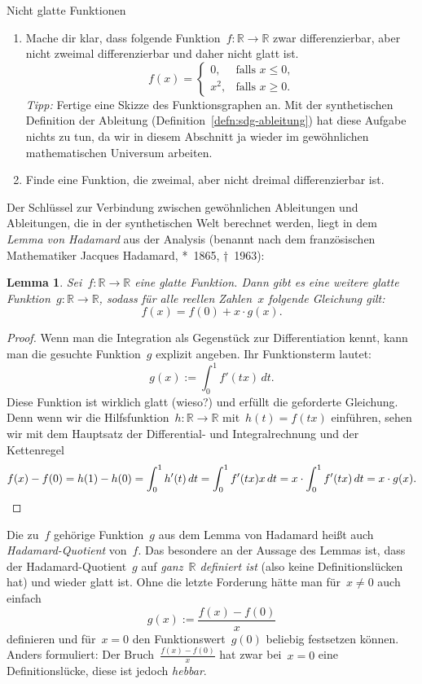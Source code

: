 \documentclass[twoside]{../zirkelblatt}
\newcommand{\RR}{\mathbb{R}}
\theoremstyle{definition}
\theoremstyle{plain}
\newtheorem{lemma}[defn]{Lemma}
\theoremstyle{remark}
\begin{document}
\begin{aufgabeShaded}{Nicht glatte Funktionen}
\begin{enumerate}
\item Mache dir klar, dass folgende Funktion~$f : \RR \to \RR$ zwar differenzierbar,
aber nicht zweimal differenzierbar und daher nicht glatt ist.
\[ f(x) = \begin{cases}
  0, & \text{falls~$x \leq 0$,} \\
  x^2, & \text{falls~$x \geq 0$.}
\end{cases} \]
\emph{Tipp:} Fertige eine Skizze des Funktionsgraphen an. Mit der synthetischen
Definition der Ableitung (Definition~\ref{defn:sdg-ableitung}) hat diese
Aufgabe nichts zu tun, da wir in diesem Abschnitt ja wieder im gewöhnlichen
mathematischen Universum arbeiten.
\item Finde eine Funktion, die zweimal, aber nicht dreimal differenzierbar ist.
\end{enumerate}
\end{aufgabeShaded}

Der Schlüssel zur Verbindung zwischen gewöhnlichen Ableitungen und Ableitungen, die in der synthetischen
Welt berechnet werden, liegt in dem \emph{Lemma
von Hadamard} aus der Analysis (benannt nach dem französischen Mathematiker
Jacques Hadamard, *~1865, †~1963):

\begin{lemma}Sei~$f : \RR \to \RR$ eine glatte Funktion. Dann gibt es eine
weitere glatte Funktion~$g : \RR \to \RR$, sodass für alle reellen Zahlen~$x$
folgende Gleichung gilt:
\[ f(x) = f(0) + x \cdot g(x). \]
\end{lemma}
\begin{proof}Wenn man die Integration als Gegenstück zur Differentiation kennt,
kann man die gesuchte Funktion~$g$ explizit angeben. Ihr Funktionsterm lautet:
\[ g(x) := \int_0^1 f'(tx) \, dt. \]
Diese Funktion ist wirklich glatt (wieso?) und erfüllt die geforderte
Gleichung. Denn wenn wir die Hilfsfunktion~$h : \RR \to \RR$ mit~$h(t) = f(tx)$
einführen, sehen wir mit dem Hauptsatz der Differential- und Integralrechnung
und der Kettenregel
\[
  f(x) - f(0) = h(1) - h(0) =
  \int_0^1 h'(t) \,dt
  = \int_0^1 f'(tx) x \,dt
  = x \cdot \int_0^1 f'(tx) \,dt
  = x \cdot g(x). \qedhere
\]
\end{proof}

Die zu~$f$ gehörige Funktion~$g$ aus dem Lemma von Hadamard heißt auch
\emph{Hadamard-Quotient} von~$f$. Das besondere an der Aussage des Lemmas ist,
dass der Hadamard-Quotient~$g$ auf \emph{ganz~$\RR$ definiert ist} (also keine
Definitionslücken hat) und wieder glatt ist. Ohne
die letzte Forderung hätte man für~$x \neq 0$ auch einfach
\[ g(x) := \frac{f(x) - f(0)}{x} \]
definieren und für~$x = 0$ den Funktionswert~$g(0)$ beliebig festsetzen können.
Anders formuliert: Der Bruch~$\frac{f(x) - f(0)}{x}$ hat zwar bei~$x = 0$ eine
Definitionslücke, diese ist jedoch \emph{hebbar}.
\end{document}
